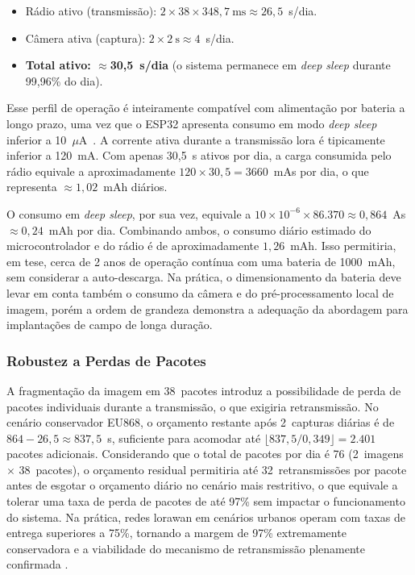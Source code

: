 \begin{itemize}
  \item Rádio ativo (transmissão): $2 \times 38 \times 348{,}7~\text{ms} \approx 26{,}5$~s/dia.
  \item Câmera ativa (captura): $2 \times 2~\text{s} \approx 4$~s/dia.
  \item \textbf{Total ativo: $\approx$30,5~s/dia} (o sistema permanece em \textit{deep sleep}
        durante 99,96\% do dia).
\end{itemize}

Esse perfil de operação é inteiramente compatível com alimentação por bateria a longo
prazo, uma vez que o ESP32 apresenta consumo em modo \textit{deep sleep} inferior a
10~$\mu$A~\cite{adam2022}. A corrente ativa durante a transmissão \gls{lora} é
tipicamente inferior a 120~mA. Com apenas 30,5~s ativos por dia, a carga consumida
pelo rádio equivale a aproximadamente $120 \times 30{,}5 = 3660$~mAs
por dia, o que representa $\approx 1{,}02$~mAh diários. 

O consumo em \textit{deep sleep}, por sua vez, equivale a $10 \times 10^{-6} \times
86{.}370 \approx 0{,}864$~As~$\approx 0{,}24$~mAh por dia. Combinando ambos, o
consumo diário estimado do microcontrolador e do rádio é de aproximadamente $1{,}26$~mAh. 
Isso permitiria, em tese, cerca de 2 anos de operação contínua com uma bateria de 1000~mAh, 
sem considerar a auto-descarga. Na prática, o dimensionamento da bateria deve levar em conta
também o consumo da câmera e do pré-processamento local de imagem,
porém a ordem de grandeza demonstra a adequação da abordagem para implantações
de campo de longa duração.
 
\subsubsection{Robustez a Perdas de Pacotes}
 
A fragmentação da imagem em 38~pacotes introduz a possibilidade de perda de pacotes
individuais durante a transmissão, o que exigiria retransmissão. No cenário conservador
EU868, o orçamento restante após 2~capturas diárias é de $864 - 26{,}5 \approx
837{,}5$~s, suficiente para acomodar até $\lfloor 837{,}5 / 0{,}349 \rfloor = 2{.}401$
pacotes adicionais. Considerando que o total de pacotes por dia é 76 (2~imagens~$\times$
38~pacotes), o orçamento residual permitiria até 32~retransmissões por
pacote antes de esgotar o orçamento diário no cenário mais restritivo, o que
equivale a tolerar uma taxa de perda de pacotes de até 97\% sem impactar o
funcionamento do sistema. Na prática, redes \gls{lorawan} em cenários urbanos operam com
taxas de entrega superiores a 75\%, tornando a margem de 97\%
extremamente conservadora e a viabilidade do mecanismo de retransmissão plenamente
confirmada \cite{adam2022}.
 
